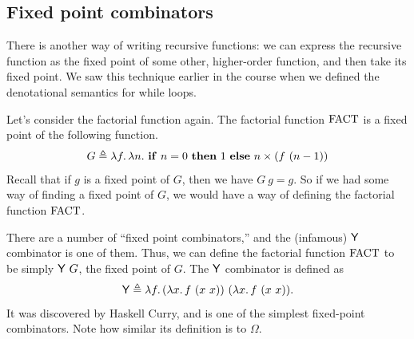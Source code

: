 \subsection{Fixed point combinators}

There is another way of writing recursive functions: we can express the recursive function as the
fixed point of some other, higher-order function, and then take its fixed point. We saw this
technique earlier in the course when we defined the denotational semantics for while loops.

Let's consider the factorial function again. The factorial function $\mathrm{FACT}$ is a fixed point of the
following function.
\[
  G\triangleq\lambda f.\,\lambda n.\ \mathbf{if}\ n=0\ \mathbf{then}\ 1\ \mathbf{else}\ n\times(f\ (n-1))
\]
Recall that if $g$ is a fixed point of $G$, then we have $G\ g=g$. So if we had some way of finding
a fixed point of $G$, we would have a way of defining the factorial function $\mathrm{FACT}$.

There are a number of ``fixed point combinators,'' and the (infamous) $\mathsf{Y}$ combinator is one of
them. Thus, we can define the factorial function $\mathrm{FACT}$ to be simply $\mathsf{Y}\ G$, the fixed point of
$G$. The $\mathsf{Y}$ combinator is defined as
\[
  \Y\triangleq\lambda f.\,(\lambda x.\,f\ (x\ x))\ (\lambda x.\,f\ (x\ x)).
\]
It was discovered by Haskell Curry, and is one of the simplest fixed-point combinators. Note how
similar its definition is to $\Omega$.

